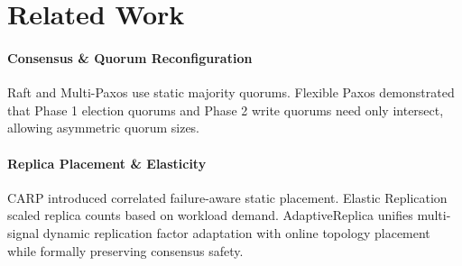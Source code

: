 \section{Related Work}
\label{sec:related_work}

\paragraph{Consensus & Quorum Reconfiguration}
Raft \cite{ongaro2014search} and Multi-Paxos \cite{lamport2001paxos} use static majority quorums. Flexible Paxos \cite{howard2016flexible} demonstrated that Phase 1 election quorums and Phase 2 write quorums need only intersect, allowing asymmetric quorum sizes.

\paragraph{Replica Placement & Elasticity}
CARP \cite{zhang2021carp} introduced correlated failure-aware static placement. Elastic Replication \cite{aguilera2020elastic} scaled replica counts based on workload demand. AdaptiveReplica unifies multi-signal dynamic replication factor adaptation with online topology placement while formally preserving consensus safety.
